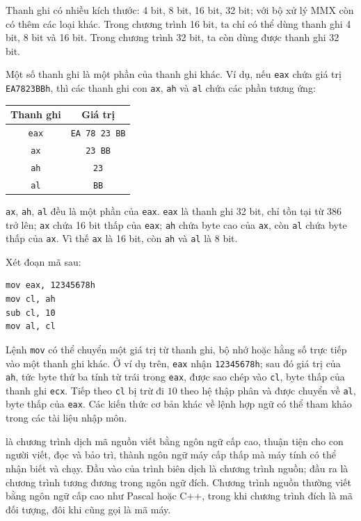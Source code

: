\documentclass[11pt]{article}
\begin{document}
Thanh ghi có nhiều kích thước: 4 bit, 8 bit, 16 bit, 32 bit; với bộ xử lý MMX
còn có thêm các loại khác. Trong chương trình 16 bit, ta chỉ có thể dùng thanh
ghi 4 bit, 8 bit và 16 bit. Trong chương trình 32 bit, ta còn dùng được thanh
ghi 32 bit.

Một số thanh ghi là một phần của thanh ghi khác. Ví dụ, nếu \texttt{eax} chứa
giá trị \texttt{EA7823BBh}, thì các thanh ghi con \texttt{ax}, \texttt{ah} và
\texttt{al} chứa các phần tương ứng:

\begin{center}
\begin{tabular}{c|c}
\hline
Thanh ghi & Giá trị \\
\hline
\texttt{eax} & \texttt{EA 78 23 BB} \\
\texttt{ax} & \texttt{23 BB} \\
\texttt{ah} & \texttt{23} \\
\texttt{al} & \texttt{BB} \\
\hline
\end{tabular}
\end{center}

\texttt{ax}, \texttt{ah}, \texttt{al} đều là một phần của \texttt{eax}.
\texttt{eax} là thanh ghi 32 bit, chỉ tồn tại từ 386 trở lên; \texttt{ax}
chứa 16 bit thấp của \texttt{eax}; \texttt{ah} chứa byte cao của
\texttt{ax}, còn \texttt{al} chứa byte thấp của \texttt{ax}. Vì thế
\texttt{ax} là 16 bit, còn \texttt{ah} và \texttt{al} là 8 bit.

Xét đoạn mã sau:
\begin{verbatim}
mov eax, 12345678h
mov cl, ah
sub cl, 10
mov al, cl
\end{verbatim}
Lệnh \texttt{mov} có thể chuyển một giá trị từ thanh ghi, bộ nhớ hoặc hằng số
trực tiếp vào một thanh ghi khác. Ở ví dụ trên, \texttt{eax} nhận
\texttt{12345678h}; sau đó giá trị của \texttt{ah}, tức byte thứ ba tính từ
trái trong \texttt{eax}, được sao chép vào \texttt{cl}, byte thấp của thanh
ghi \texttt{ecx}. Tiếp theo \texttt{cl} bị trừ đi \(10\) theo hệ thập phân và
được chuyển về \texttt{al}, byte thấp của \texttt{eax}. Các kiến thức cơ bản
khác về lệnh hợp ngữ có thể tham khảo trong các tài liệu nhập môn.

 là chương trình dịch mã nguồn viết bằng ngôn ngữ cấp
cao, thuận tiện cho con người viết, đọc và bảo trì, thành ngôn ngữ máy cấp
thấp mà máy tính có thể nhận biết và chạy. Đầu vào của trình biên dịch là
chương trình nguồn; đầu ra là chương trình tương đương trong ngôn ngữ đích.
Chương trình nguồn thường viết bằng ngôn ngữ cấp cao như Pascal hoặc C++,
trong khi chương trình đích là mã đối tượng, đôi khi cũng gọi là mã máy.
\end{document}
